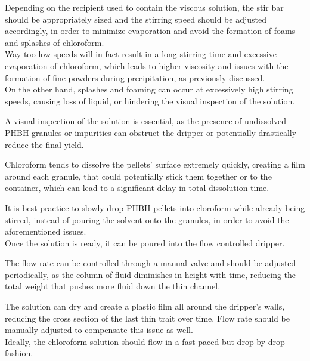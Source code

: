 \documentclass{article}
\begin{document}
        Depending on the recipient used to contain the viscous solution, the stir bar should be appropriately sized and 
        the stirring speed should be adjusted accordingly, in order to minimize evaporation and avoid the formation of foams and 
        splashes of chloroform. \\ 
        
        Way too low speeds will in fact result in a long stirring time and excessive evaporation of chloroform, which leads to 
        higher viscosity and issues with the formation of fine powders during precipitation, as previously discussed. \\ 

        On the other hand, splashes and foaming can occur at excessively high stirring speeds, causing loss of liquid, or
        hindering the visual inspection of the solution. 

        A visual inspection of the solution is essential, as the presence of undissolved PHBH granules or impurities can 
        obstruct the dripper or potentially drastically reduce the final yield. 

        Chloroform tends to dissolve the pellets' surface extremely quickly, creating a film around each granule, that could potentially stick 
        them together or to the container, which can lead to a significant delay in total dissolution time. 

        It is best practice to slowly drop PHBH pellets into cloroform while already being stirred, instead of pouring 
        the solvent onto the granules, in order to avoid the aforementioned issues. \\ 

        Once the solution is ready, it can be poured into the flow controlled dripper. 

        The flow rate can be controlled through a manual valve and should be adjusted periodically, as the column of fluid diminishes 
        in height with time, reducing the total weight that pushes more fluid down the thin channel. 

        The solution can dry and create a plastic film all around the dripper's walls, reducing the cross section of the last thin 
        trait over time. Flow rate should be manually adjusted to compensate this issue as well. \\ 

        Ideally, the chloroform solution should flow in a fast paced but drop-by-drop fashion. 
\end{document}
